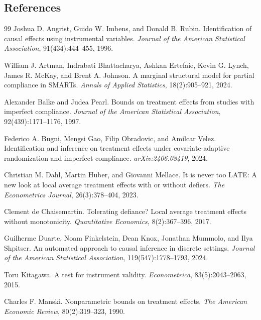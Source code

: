 \documentclass[11pt]{article}
\theoremstyle{definition}
\theoremstyle{plain}
\theoremstyle{remark}
\begin{document}
\subsection*{References}
\begin{thebibliography}{99}
Joshua D. Angrist, Guido W. Imbens, and Donald B. Rubin.
\newblock Identification of causal effects using instrumental variables.
\newblock \emph{Journal of the American Statistical Association}, 91(434):444--455, 1996.

William J. Artman, Indrabati Bhattacharya, Ashkan Ertefaie, Kevin G. Lynch, James R. McKay, and Brent A. Johnson.
\newblock A marginal structural model for partial compliance in SMARTs.
\newblock \emph{Annals of Applied Statistics}, 18(2):905--921, 2024.

Alexander Balke and Judea Pearl.
\newblock Bounds on treatment effects from studies with imperfect compliance.
\newblock \emph{Journal of the American Statistical Association}, 92(439):1171--1176, 1997.

Federico A. Bugni, Mengsi Gao, Filip Obradovic, and Amilcar Velez.
\newblock Identification and inference on treatment effects under covariate-adaptive randomization and imperfect compliance.
\newblock \emph{arXiv:2406.08419}, 2024.

Christian M. Dahl, Martin Huber, and Giovanni Mellace.
\newblock It is never too LATE: A new look at local average treatment effects with or without defiers.
\newblock \emph{The Econometrics Journal}, 26(3):378--404, 2023.

Clement de Chaisemartin.
\newblock Tolerating defiance? Local average treatment effects without monotonicity.
\newblock \emph{Quantitative Economics}, 8(2):367--396, 2017.

Guilherme Duarte, Noam Finkelstein, Dean Knox, Jonathan Mummolo, and Ilya Shpitser.
\newblock An automated approach to causal inference in discrete settings.
\newblock \emph{Journal of the American Statistical Association}, 119(547):1778--1793, 2024.

Toru Kitagawa.
\newblock A test for instrument validity.
\newblock \emph{Econometrica}, 83(5):2043--2063, 2015.

Charles F. Manski.
\newblock Nonparametric bounds on treatment effects.
\newblock \emph{The American Economic Review}, 80(2):319--323, 1990.


\end{thebibliography}
\end{document}
